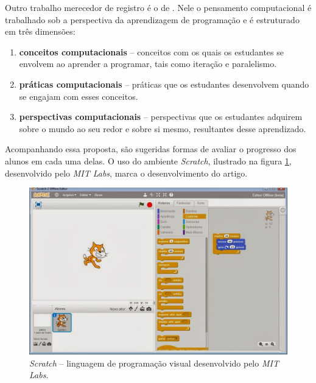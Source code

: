

Outro trabalho merecedor de registro é o de . Nele o pensamento computacional é trabalhado sob a perspectiva da aprendizagem de programação e é estruturado em três dimensões: 

\begin{enumerate}
\item \textbf{conceitos computacionais} -- conceitos com os quais os estudantes se envolvem ao aprender a programar, tais como iteração e paralelismo.

\item \textbf{práticas computacionais} -- práticas que os estudantes desenvolvem quando se engajam com esses conceitos.

\item \textbf{perspectivas computacionais} -- perspectivas que os estudantes adquirem sobre o mundo ao seu redor e sobre si mesmo, resultantes desse aprendizado.
\end{enumerate}

Acompanhando essa proposta, são sugeridas formas de avaliar o progresso dos alunos em cada uma delas. O uso do ambiente \textit{Scratch}, ilustrado na figura \ref{fig:scratch}, desenvolvido pelo \textit{MIT Labs}, marca o desenvolvimento do artigo.

\begin{figure}[!htb]
	\caption{\textit{Scratch} -- linguagem de programação visual desenvolvido pelo \textit{MIT Labs}.}
  \begin{center}
	  \includegraphics[max width=\textwidth]{imagens/scratch}
	\end{center}
	\label{fig:scratch}
\end{figure}

